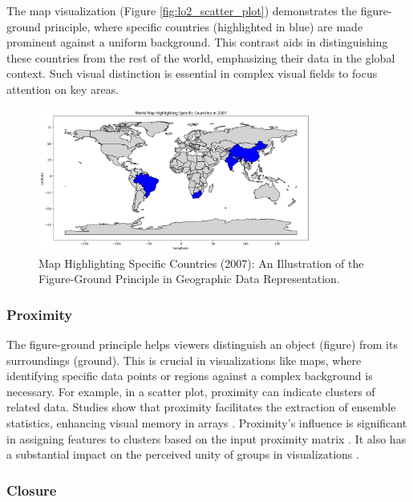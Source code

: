 The map visualization (Figure \ref{fig:lo2_scatter_plot}) demonstrates the figure-ground principle, where specific countries (highlighted in blue) are made prominent against a uniform background. This contrast aids in distinguishing these countries from the rest of the world, emphasizing their data in the global context. Such visual distinction is essential in complex visual fields to focus attention on key areas.

\begin{figure}[h]
    \centering
    \includegraphics[width=0.8\textwidth]{images/plots/lo2_world_map_highlight_countries_2007.png} 
    \caption{Map Highlighting Specific Countries (2007): An Illustration of the Figure-Ground Principle in Geographic Data Representation.}
    \label{fig:lo2_map}
\end{figure}


\subsubsection{Proximity}

The figure-ground principle helps viewers distinguish an object (figure) from its surroundings (ground). This is crucial in visualizations like maps, where identifying specific data points or regions against a complex background is necessary. For example, in a scatter plot, proximity can indicate clusters of related data. Studies show that proximity facilitates the extraction of ensemble statistics, enhancing visual memory in arrays \cite{imMeanSizeUnit2014}. Proximity's influence is significant in assigning features to clusters based on the input proximity matrix \cite{scottFeatureGroupingRelocalisation1990}. It also has a substantial impact on the perceived unity of groups in visualizations \cite{promannEffectProximitySocial2018}.

\subsubsection{Closure}

